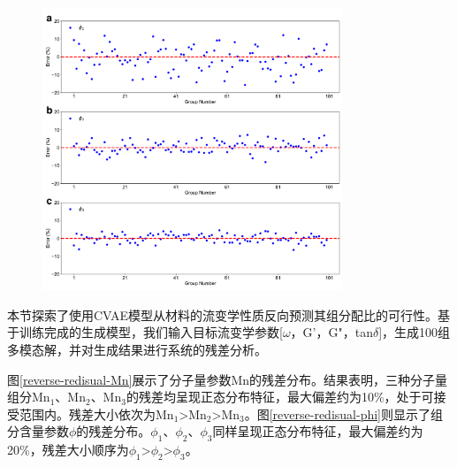 \begin{figure}[htbp]
  \centering
  \includegraphics[width=0.8\textwidth]{Fig/reverse-redisual-phi.pdf}
\end{figure}
本节探索了使用CVAE模型从材料的流变学性质反向预测其组分配比的可行性。基于训练完成的生成模型，我们输入目标流变学参数[$\omega$，G'，G"，tan$\delta$]，生成100组多模态解，并对生成结果进行系统的残差分析。

图\ref{reverse-redisual-Mn}展示了分子量参数Mn的残差分布。结果表明，三种分子量组分Mn$_1$、Mn$_2$、Mn$_3$的残差均呈现正态分布特征，最大偏差约为10\%，处于可接受范围内。残差大小依次为Mn$_1$>Mn$_2$>Mn$_3$。图\ref{reverse-redisual-phi}则显示了组分含量参数$\phi$的残差分布。$\phi_1$、$\phi_2$、$\phi_3$同样呈现正态分布特征，最大偏差约为20\%，残差大小顺序为$\phi_1$>$\phi_2$>$\phi_3$。

